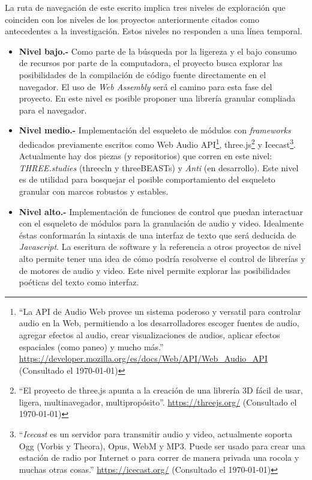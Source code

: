La ruta de navegación de este escrito implica tres niveles de exploración que coinciden con los niveles de los proyectos anteriormente citados como antecedentes a la investigación. Estos niveles no responden a una línea temporal.  

\begin{itemize}


\item \textbf{Nivel bajo.-} Como parte de la búsqueda por la ligereza y el bajo consumo de recursos por parte de la computadora, el proyecto busca explorar las posibilidades de la compilación de código fuente directamente en el navegador. El uso de \textit{Web Assembly} será el camino para esta fase del proyecto. En este nivel es posible proponer una librería granular compliada para el navegador. 
\item \textbf{Nivel medio.-} Implementación del esqueleto de módulos con \textit{frameworks} dedicados previamente escritos como Web Audio API\footnote{``La API de Audio Web provee un sistema poderoso y versatil para controlar audio en la Web, permitiendo a los desarrolladores escoger fuentes de audio, agregar efectos al audio, crear visualizaciones de audios, aplicar efectos espaciales (como paneo) y mucho más.'' \url{https://developer.mozilla.org/es/docs/Web/API/Web_Audio_API} (Consultado el \today)}, three.js\footnote{``El proyecto de three.js apunta a la creación de una librería 3D fácil de usar, ligera, multinavegador, multipropósito''. \url{https://threejs.org/} (Consultado el \today)} y Icecast\footnote{``\textit{Icecast} es un servidor para transmitir audio y video, actualmente soporta Ogg (Vorbis y Theora), Opus, WebM y MP3. Puede ser usado para crear una estación de radio por Internet o para correr de manera privada una rocola y muchas otras cosas.'' \url{https://icecast.org/} (Consultado el \today)}. Actualmente hay dos piezas (y repositorios) que corren en este nivel: \textit{THREE.studies} (threecln y threeBEASTs) y \textit{Anti} (en desarrollo). Este nivel es de utilidad para bosquejar el posible comportamiento del esqueleto granular con marcos robustos y estables. 
\item \textbf{Nivel alto.-} Implementación de funciones de control que puedan interactuar con el esqueleto de módulos para la granulación de audio y video. Idealmente éstas conformarán la sintaxis de una interfaz de texto que será deducida de \textit{Javascript}. La escritura de software y la referencia a otros proyectos de nivel alto permite tener una idea de cómo podría resolverse el control de librerías y de motores de audio y video. Este nivel permite explorar las posibilidades poéticas del texto como interfaz. 
  
\end{itemize}

